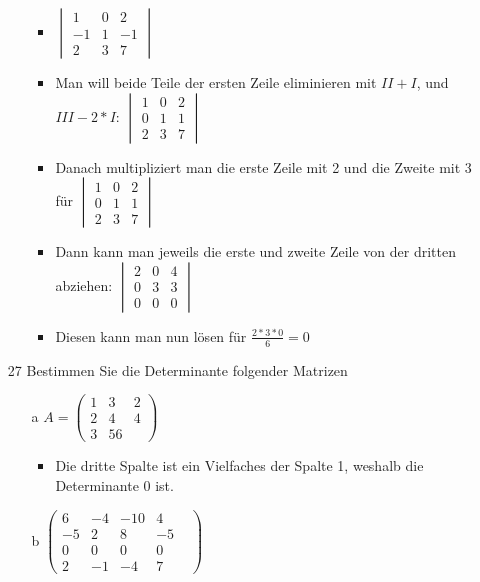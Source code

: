 \documentclass{article}
\begin{document}
\begin{itemize}
\begin{itemize}
			\begin{itemize}
				\item{$\begin{vmatrix} 1 & 0 & 2 \\ -1 & 1 & -1 \\ 2 & 3 & 7 \end{vmatrix}$}
				\item{Man will beide Teile der ersten Zeile eliminieren mit $II+I$, und $III-2*I$: $\begin{vmatrix} 1 & 0 & 2 \\ 0 & 1 & 1 \\ 2 & 3 & 7 \end{vmatrix}$}
				\item{Danach multipliziert man die erste Zeile mit 2 und die Zweite mit 3 für $\begin{vmatrix} 1 & 0 & 2 \\ 0 & 1 & 1 \\ 2 & 3 & 7 \end{vmatrix}$}
				\item{Dann kann man jeweils die erste und zweite Zeile von der dritten abziehen: $\begin{vmatrix} 2 & 0 & 4 \\ 0 & 3 & 3 \\ 0 & 0 & 0 \end{vmatrix}$}
				\item{Diesen kann man nun lösen für $\frac{2*3*0}{6}=0$}
			\end{itemize}
		\end{itemize}
		\item[27]{Bestimmen Sie die Determinante folgender Matrizen}
		\begin{itemize}
			\item[a]{$A=\begin{pmatrix} 1 & 3 & 2 \\ 2 & 4 & 4 \\ 3 & 5 6 \end{pmatrix}$}
			\begin{itemize}
				\item{Die dritte Spalte ist ein Vielfaches der Spalte 1, weshalb die Determinante 0 ist.}
			\end{itemize}
			\item[b]{$\begin{pmatrix} 6 & -4 & -10 & 4 \\ -5 & 2 & 8 & -5 \\ 0 & 0 & 0 & 0 & \\ 2 & -1 & -4 & 7 \end{pmatrix}$}

\end{itemize}
\end{itemize}
\end{document}
